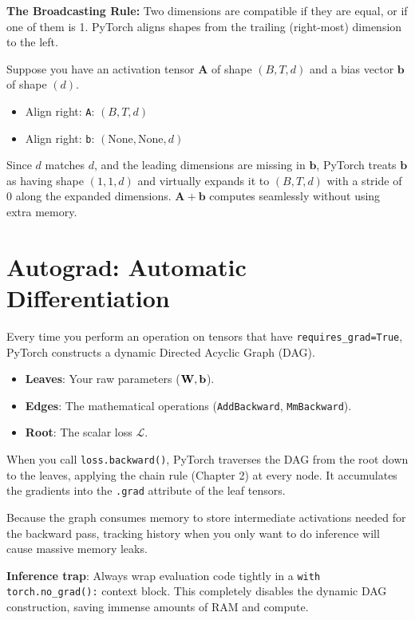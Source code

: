 \textbf{The Broadcasting Rule:} Two dimensions are compatible if they are equal, or if one of them is 1. PyTorch aligns shapes from the trailing (right-most) dimension to the left. 

Suppose you have an activation tensor $\mathbf{A}$ of shape $(B, T, d)$ and a bias vector $\mathbf{b}$ of shape $(d)$.
\begin{itemize}
    \item Align right: \texttt{A}: $(B, T, d)$
    \item Align right: \texttt{b}: $(\text{None}, \text{None}, d)$
\end{itemize}
Since $d$ matches $d$, and the leading dimensions are missing in $\mathbf{b}$, PyTorch treats $\mathbf{b}$ as having shape $(1, 1, d)$ and virtually expands it to $(B, T, d)$ with a stride of 0 along the expanded dimensions. $\mathbf{A} + \mathbf{b}$ computes seamlessly without using extra memory.

\section{Autograd: Automatic Differentiation}

Every time you perform an operation on tensors that have \texttt{requires\_grad=True}, PyTorch constructs a dynamic Directed Acyclic Graph (DAG). 
\begin{itemize}
    \item \textbf{Leaves}: Your raw parameters ($\mathbf{W}, \mathbf{b}$).
    \item \textbf{Edges}: The mathematical operations (\texttt{AddBackward}, \texttt{MmBackward}).
    \item \textbf{Root}: The scalar loss $\mathcal{L}$.
\end{itemize}

When you call \texttt{loss.backward()}, PyTorch traverses the DAG from the root down to the leaves, applying the chain rule (Chapter 2) at every node. It accumulates the gradients into the \texttt{.grad} attribute of the leaf tensors.

Because the graph consumes memory to store intermediate activations needed for the backward pass, tracking history when you only want to do inference will cause massive memory leaks. 

\begin{warningbox}
\textbf{Inference trap}: Always wrap evaluation code tightly in a \texttt{with torch.no\_grad():} context block. This completely disables the dynamic DAG construction, saving immense amounts of RAM and compute.
\end{warningbox}

